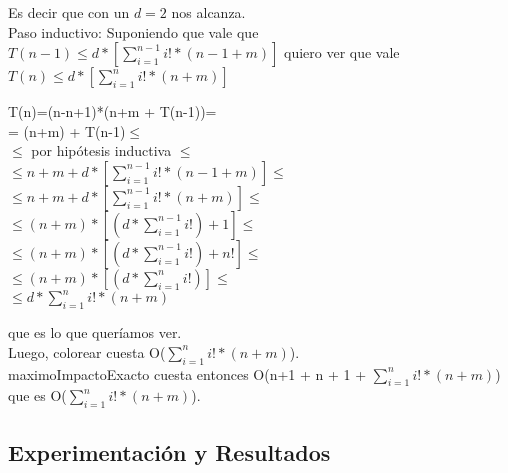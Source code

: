 \indent Es decir que con un $d=2$ nos alcanza.\\


\indent Paso inductivo: Suponiendo que vale que $T(n-1) \leq d * [\sum_{i=1}^{n-1} i! * (n-1+m)] $ quiero ver que vale $T(n) \leq d * [\sum_{i=1}^{n} i! * (n+m)] $ \\


\begin{center}
T(n)=(n-n+1)*(n+m + T(n-1))=\\

= (n+m) + T(n-1)$\leq$\\

$\leq$ por hipótesis inductiva $\leq$\\

$\leq n+m + d * [\sum_{i=1}^{n-1} i! * (n-1+m)] \leq $\\

$\leq n+m + d * [\sum_{i=1}^{n-1} i! * (n+m)] \leq$ \\

$\leq (n+m) *[ (d* \sum_{i=1}^{n-1} i!) + 1] \leq$ \\

$\leq (n+m) *[ (d* \sum_{i=1}^{n-1} i!) + n!] \leq$ \\

$\leq (n+m) *[ (d* \sum_{i=1}^{n} i!)] \leq$\\

$\leq  d* \sum_{i=1}^{n} i!*(n+m)$\\

\end{center}

\indent que es lo que queríamos ver.\\

\indent Luego, colorear cuesta O($\sum_{i=1}^{n} i! * (n+m) $).\\

\indent maximoImpactoExacto cuesta entonces O(n+1 + n + 1 + $\sum_{i=1}^{n} i! * (n+m) $) que es O($\sum_{i=1}^{n} i! * (n+m) $).\\

\subsection{Experimentación y Resultados}
